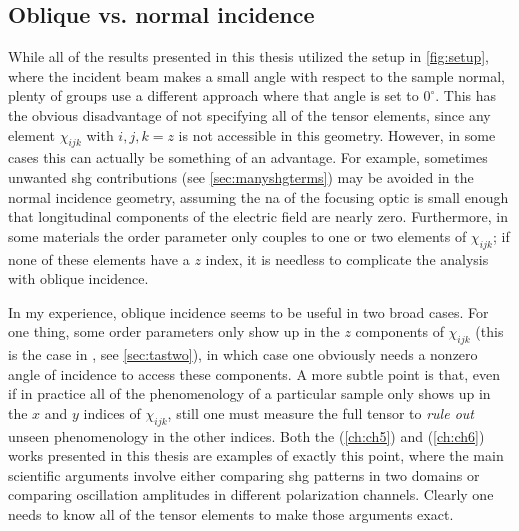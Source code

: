 \subsection{Oblique vs. normal incidence}

While all of the results presented in this thesis utilized the setup in \cref{fig:setup}, where the incident beam makes a small angle with respect to the sample normal, plenty of groups use a different approach where that angle is set to $0^\circ$.
This has the obvious disadvantage of not specifying all of the tensor elements, since any element $\chi_{ijk}$ with $i, j, k = z$ is not accessible in this geometry.
However, in some cases this can actually be something of an advantage.
For example, sometimes unwanted \gls{shg} contributions (see \cref{sec:manyshgterms}) may be avoided in the normal incidence geometry, assuming the \gls{na} of the focusing optic is small enough that longitudinal components of the electric field are nearly zero.
Furthermore, in some materials the order parameter only couples to one or two elements of $\chi_{ijk}$; if none of these elements have a $z$ index, it is needless to complicate the analysis with oblique incidence.

In my experience, oblique incidence seems to be useful in two broad cases.
For one thing, some order parameters only show up in the $z$ components of $\chi_{ijk}$ (this is the case in \tastwo, see \cref{sec:tastwo}), in which case one obviously needs a nonzero angle of incidence to access these components.
A more subtle point is that, even if in practice all of the phenomenology of a particular sample only shows up in the $x$ and $y$ indices of $\chi_{ijk}$, still one must measure the full tensor to \emph{rule out} unseen phenomenology in the other indices.
Both the  (\cref{ch:ch5}) and  (\cref{ch:ch6}) works presented in this thesis are examples of exactly this point, where the main scientific arguments involve either comparing \gls{shg} patterns in two domains or comparing oscillation amplitudes in different polarization channels.
Clearly one needs to know all of the tensor elements to make those arguments exact.
